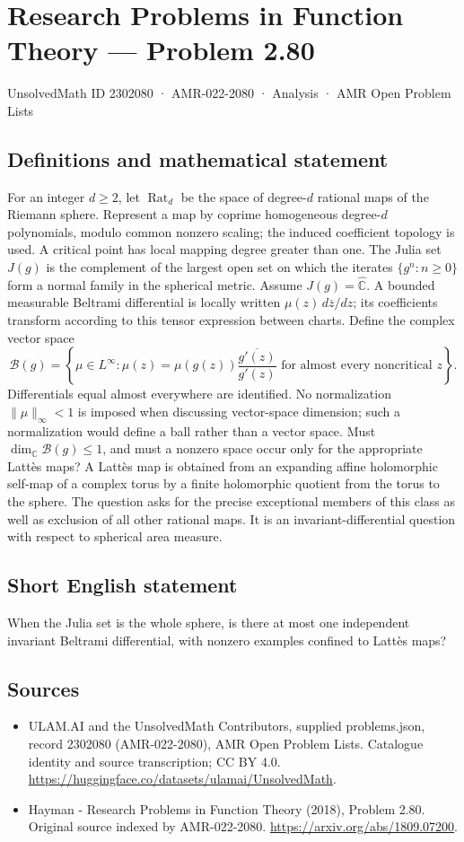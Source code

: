 \documentclass[11pt,a4paper]{article}
\begin{document}
\section*{Research Problems in Function Theory — Problem 2.80}\label{2302080}
{\small UnsolvedMath ID 2302080 · AMR-022-2080 · Analysis · AMR Open Problem Lists}
\subsection{Definitions and mathematical statement}
For an integer $d\ge2$, let $\operatorname{Rat}_d$ be the space of degree-$d$ rational maps of the Riemann sphere. Represent a map by coprime homogeneous degree-$d$ polynomials, modulo common nonzero scaling; the induced coefficient topology is used. A critical point has local mapping degree greater than one. The Julia set $J(g)$ is the complement of the largest open set on which the iterates $\{g^n:n\ge0\}$ form a normal family in the spherical metric.
Assume $J(g)=\widehat{\mathbb C}$. A bounded measurable Beltrami differential is locally written $\mu(z)\,d\overline z/dz$; its coefficients transform according to this tensor expression between charts. Define the complex vector space
\[
\mathcal B(g)=\left\{\mu\in L^\infty:
\mu(z)=\mu(g(z))\frac{\overline{g'(z)}}{g'(z)}
\text{ for almost every noncritical }z\right\}.
\]
Differentials equal almost everywhere are identified. No normalization $\|\mu\|_\infty<1$ is imposed when discussing vector-space dimension; such a normalization would define a ball rather than a vector space.
Must $\dim_{\mathbb C}\mathcal B(g)\le1$, and must a nonzero space occur only for the appropriate Latt\`es maps? A Latt\`es map is obtained from an expanding affine holomorphic self-map of a complex torus by a finite holomorphic quotient from the torus to the sphere. The question asks for the precise exceptional members of this class as well as exclusion of all other rational maps. It is an invariant-differential question with respect to spherical area measure.
\subsection{Short English statement}
When the Julia set is the whole sphere, is there at most one independent invariant Beltrami differential, with nonzero examples confined to Lattès maps?
\subsection{Sources}
\begin{itemize}
\item[S1] ULAM.AI and the UnsolvedMath Contributors, supplied problems.json, record 2302080 (AMR-022-2080), AMR Open Problem Lists. Catalogue identity and source transcription; CC BY 4.0.
\url{https://huggingface.co/datasets/ulamai/UnsolvedMath}.
\item[S2] Hayman - Research Problems in Function Theory (2018), Problem 2.80. Original source indexed by AMR-022-2080.
\url{https://arxiv.org/abs/1809.07200}.
\end{itemize}
\end{document}

